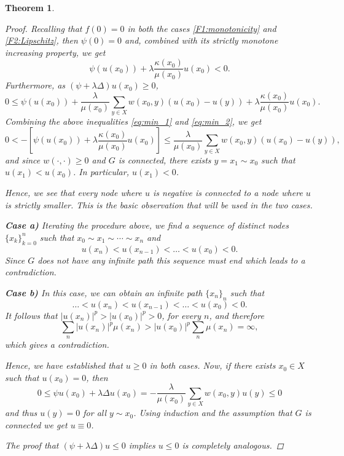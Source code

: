 \documentclass[journal]{article}
\newtheorem{theorem}{Theorem}[section]
\theoremstyle{nonitalic}
\theoremstyle{nonitalic}
\theoremstyle{plain} %
\numberwithin{equation}{section}
\begin{document}
\begin{theorem}
\begin{proof}
Recalling that $f(0) = 0$ in both the cases \textnormal{\ref{F1:monotonicity}} and \textnormal{\ref{F2:Lipschitz}}, then $\psi(0)=0$ and, combined with its  strictly monotone increasing property, we get
\begin{equation}\label{eq:min_1}
	\psi(u(x_{0}))+ \lambda\frac{\kappa(x_{0})}{\mu(x_{0})}u(x_{0}) < 0.
\end{equation}
Furthermore, as $\left( \psi + \lambda\Delta\right)u(x_0) \geq 0$,
\begin{equation}\label{eq:min_2}
	0\leq  \psi(u(x_{0}))+\frac{\lambda}{\mu(x_{0})}\sum_{y\in X}w(x_{0},y)\left(u(x_{0})-u(y)\right) + \lambda\frac{\kappa(x_{0})}{\mu(x_{0})}u(x_{0}).
\end{equation}
Combining the above inequalities \eqref{eq:min_1} and \eqref{eq:min_2}, we get
\begin{equation*}
	0<-\left[ \psi(u(x_{0})) +\lambda\frac{\kappa(x_{0})}{\mu(x_{0})}u(x_{0}) \right]\leq \frac{\lambda}{\mu(x_{0})}\sum_{y\in X}w(x_{0},y)\left(u(x_{0})-u(y)\right),
\end{equation*}
and since $w(\cdot,\cdot)\geq 0$ and $G$ is connected, there exists $y=x_{1}\sim x_{0}$ such that $u(x_{1})< u(x_{0})$. In particular, $u(x_1)<0$.

Hence, we see that every node where $u$ is negative is connected to a node where $u$ is strictly smaller. This is the basic observation that will be used in the two cases.
\vspace{0.2cm}

\noindent \textbf{Case a)} Iterating the procedure above, we find a sequence of distinct nodes $\{x_{k}\}_{k=0}^n$ such that $x_{0}\sim x_{1}\sim \cdots \sim x_{n}$ and
$$
u(x_{n})< u(x_{n-1}) < \ldots < u(x_{0}) <0.
$$
Since $G$ does not have any infinite path this sequence must end which leads to a contradiction.

\vspace{0.2cm}

\noindent \textbf{Case b)} 
In this case, we can obtain an infinite path $\{x_{n}\}_n$ such that 
$$
\ldots < u(x_{n})< u(x_{n-1}) < \ldots < u(x_{0}) <0.
$$
It follows that $|u(x_{n})|^p >|u(x_{0})|^p >0$, for every $n$, and therefore $$\sum_{{n}}|u(x_{n})|^p\mu(x_{n})>|u(x_{0})|^p\sum_{n}\mu(x_{n})=\infty,$$ which gives a contradiction.
\vspace{0.5cm}

Hence, we have established that $u \geq 0$ in both cases. Now, if there exists $x_0 \in X$ such that $u(x_0)=0$, then
$$0\leq  \psi u(x_{0}) + \lambda\Delta u(x_{0}) =-\frac{\lambda}{\mu(x_{0})}\sum_{y\in X}w(x_{0},y)u(y) \leq 0 $$
and thus $u(y)=0$ for all $y\sim x_0$.
Using induction and the assumption that $G$ is connected we get $u\equiv 0$.

The proof that $\left( \psi + \lambda\Delta\right) u \leq 0$ implies $u \leq 0$ is completely analogous.
    
\end{proof}

\end{theorem}
\end{document}
